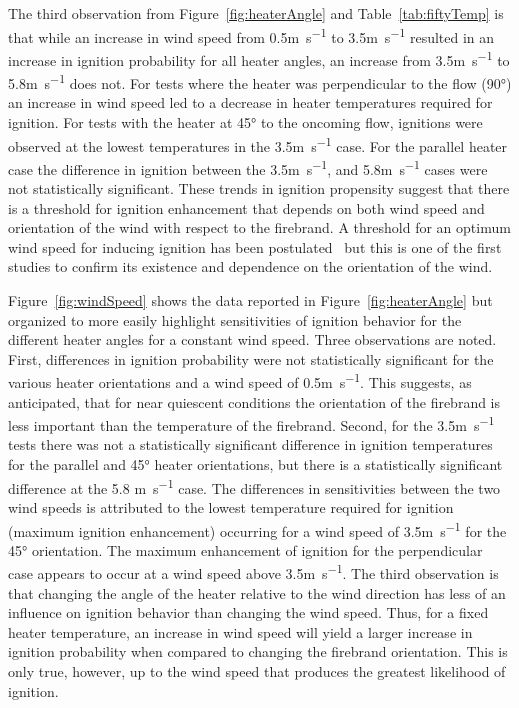     The third observation from Figure~\ref{fig:heaterAngle} and Table~\ref{tab:fiftyTemp} is that while an increase in wind speed from 0.5\si{\meter\per\second} to 3.5\si{\meter\per\second} resulted in an increase in ignition probability for all heater angles, an increase from 3.5\si{\meter\per\second} to 5.8\si{\meter\per\second} does not. For tests where the heater was perpendicular to the flow (90\si{\degree}) an increase in wind speed led to a decrease in heater temperatures required for ignition. For tests with the heater at 45\si{\degree} to the oncoming flow, ignitions were observed at the lowest temperatures in the 3.5\si{\meter\per\second} case. For the parallel heater case the difference in ignition between the 3.5\si{\meter\per\second}, and 5.8\si{\meter\per\second} cases were not statistically significant. These trends in ignition propensity suggest that there is a threshold for ignition enhancement that depends on both wind speed and orientation of the wind with respect to the firebrand. A threshold for an optimum wind speed for inducing ignition has been postulated~\cite{Plucinski2008} but this is one of the first studies to confirm its existence and dependence on the orientation of the wind.
    
    Figure~\ref{fig:windSpeed} shows the data reported in Figure~\ref{fig:heaterAngle} but organized to more easily highlight sensitivities of ignition behavior for the different heater angles for a constant wind speed. Three observations are noted. First, differences in ignition probability were not statistically significant for the various heater orientations and a wind speed of 0.5\si{\meter\per\second}. This suggests, as anticipated, that for near quiescent conditions the orientation of the firebrand is less important than the temperature of the firebrand. Second, for the 3.5\si{\meter\per\second} tests there was not a statistically significant difference in ignition temperatures for the parallel and 45\si{\degree} heater orientations, but there is a statistically significant difference at the 5.8 \si{\meter\per\second} case. The differences in sensitivities between the two wind speeds is attributed to the lowest temperature required for ignition (maximum ignition enhancement) occurring for a wind speed of 3.5\si{\meter\per\second} for the 45\si{\degree} orientation. The maximum enhancement of ignition for the perpendicular case appears to occur at a wind speed above 3.5\si{\meter\per\second}. The third observation is that changing the angle of the heater relative to the wind direction has less of an influence on ignition behavior than changing the wind speed.
    Thus, for a fixed heater temperature, an increase in wind speed will yield a larger increase in ignition probability when compared to changing the firebrand orientation. This is only true, however, up to the wind speed that produces the greatest likelihood of ignition. 
    
